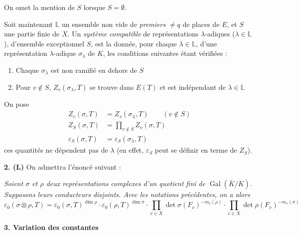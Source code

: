 \documentclass[11pt,a4paper]{article}
\theoremstyle{plain}
\DeclareMathOperator{\Gal}{Gal}
\begin{document}
On omet la mention de $S$ lorsque $S = \emptyset$.

\vspace{0.5cm}

Soit maintenant $\mathbb{L}$ un ensemble non vide de \emph{premiers} $\neq q$ de places de $E$, et $S$ une partie finie de $X$. Un \emph{syst\`eme compatible} de repr\'esentations $\lambda$-adiques ($\lambda \in \mathbb{L}$), d'ensemble exceptionnel $S$, est la donn\'ee, pour chaque $\lambda \in \mathbb{L}$, d'une repr\'esentation $\lambda$-adique $\sigma_\lambda$ de $K$, les conditions suivantes \'etant v\'erifi\'ees :

\begin{enumerate}[label=(\roman*)]
\item Chaque $\sigma_\lambda$ est non ramifi\'e en dehors de $S$
\item Pour $v \notin S$, $Z_v(\sigma_\lambda, T)$ se trouve dans $E(T)$ et est ind\'ependant de $\lambda \in \mathbb{L}$
\end{enumerate}

On pose
\begin{align*}
Z_v(\sigma, T) &= Z_v(\sigma_\lambda, T) \qquad (v \notin S) \\
Z_S(\sigma, T) &= \prod_{v \notin S} Z_v(\sigma, T) \\
\varepsilon_S(\sigma, T) &= \varepsilon_S(\sigma_\lambda, T)
\end{align*}
ces quantit\'es ne d\'ependent pas de $\lambda$ (en effet, $\varepsilon_S$ peut se d\'efinir en terme de $Z_S$).

\vspace{0.5cm}

\noindent\textbf{2. (L)} \quad On admettra l'\'enonc\'e suivant :

\smallskip

\textit{Soient $\sigma$ et $\rho$ deux repr\'esentations complexes d'un quotient fini de $\Gal(\overline{K}/K)$. Supposons leurs conducteurs disjoints. Avec les notations pr\'ec\'edentes, on a alors}
\begin{equation}\tag{L}
\varepsilon_0(\sigma \otimes \rho, T) = \varepsilon_0(\sigma, T)^{\dim \rho} \cdot \varepsilon_0(\rho, T)^{\dim \sigma} \cdot \prod_{v \in X} \det \sigma(F_v)^{-m_v(\rho)} \cdot \prod_{v \in X} \det \rho(F_v)^{-m_v(\sigma)}
\end{equation}

\newpage

\noindent\textbf{3. Variation des constantes}

\vspace{0.3cm}
\end{document}

